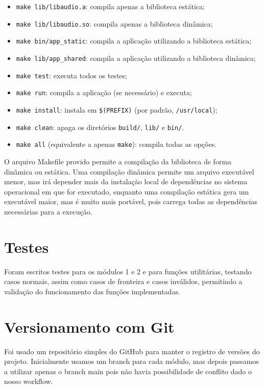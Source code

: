 \documentclass{article}
\begin{document}
\begin{itemize}
    \item \texttt{make lib/libaudio.a}: compila apenas a biblioteca estática;
    \item \texttt{make lib/libaudio.so}: compila apenas a biblioteca dinâmica;
    \item \texttt{make bin/app\_static}: compila a aplicação utilizando a biblioteca estática;
    \item \texttt{make lib/app\_shared}: compila a aplicação utilizando a biblioteca dinâmica;
    \item \texttt{make test}: executa todos os testes;
    \item \texttt{make run}: compila a aplicação (se necessário) e executa;
    \item \texttt{make install}: instala em \texttt{\$(PREFIX)} (por padrão, \texttt{/usr/local});
    \item \texttt{make clean}: apaga os diretórios \texttt{build/}, \texttt{lib/} e \texttt{bin/}.
    \item \texttt{make all} (equivalente a apenas \texttt{make}): compila todas as opções.
\end{itemize}

O arquivo Makefile provido permite a compilação da biblioteca de forma dinâmica ou estática. Uma compilação dinâmica permite um arquivo executável menor, mas irá depender mais da instalação local de dependências no sistema operacional em que for executado, enquanto uma compilação estática gera um executável maior, mas é muito mais portável, pois carrega todas as dependências necessárias para a execução.

\section{Testes}
Foram escritos testes para os módulos 1 e 2 e para funções utilitárias, testando casos normais, assim como casos de fronteira e casos inválidos, permitindo a validação do funcionamento das funções implementadas.

\section{Versionamento com Git}

Foi usado um repositório simples do GitHub para manter o registro de versões do projeto. Inicialmente usamos um branch para cada módulo, mas depois passamos a utilizar apenas o branch main pois não havia possibilidade de conflito dado o nosso workflow.
\end{document}
